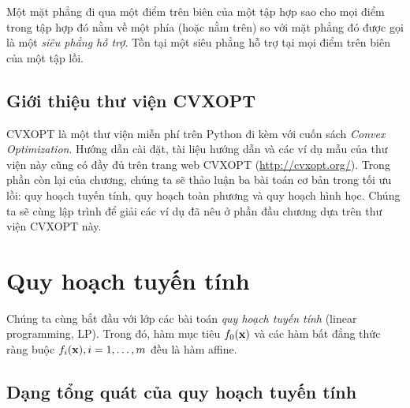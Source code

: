 Một mặt phẳng đi qua một điểm trên biên của một tập hợp sao cho mọi điểm trong
tập hợp đó nằm về một phía (hoặc nằm trên) so với mặt phẳng đó được gọi là
một \textit{siêu phẳng hỗ trợ}. Tồn tại một siêu phẳng hỗ trợ tại mọi điểm trên biên của một tập lồi.


\subsection{Giới thiệu thư viện CVXOPT}
CVXOPT là một thư viện miễn phí trên Python đi kèm với cuốn sách \textit{Convex
Optimization}. Hướng dẫn cài đặt, tài liệu hướng dẫn và các ví dụ mẫu của thư
viện này cũng có đầy đủ trên trang web CVXOPT (\url{http://cvxopt.org/}). Trong
phần còn lại của chương, chúng ta sẽ thảo luận ba bài toán cơ bản trong tối ưu lồi: quy hoạch tuyến tính, quy hoạch toàn phương và quy hoạch hình học. Chúng ta sẽ cùng lập trình để giải các ví dụ đã nêu ở phần đầu chương dựa trên thư viện CVXOPT này.


\section{Quy hoạch tuyến tính}
Chúng ta cùng bắt đầu với lớp các bài toán \textit{quy hoạch tuyến tính} (linear programming, LP). Trong đó, hàm mục tiêu $f_0(\mathbf{x})$ và
các hàm bất đẳng thức ràng buộc $f_i(\mathbf{x}), i = 1, \dots, m$ đều là hàm {affine}.

\subsection{Dạng tổng quát của quy hoạch tuyến tính}
{}

